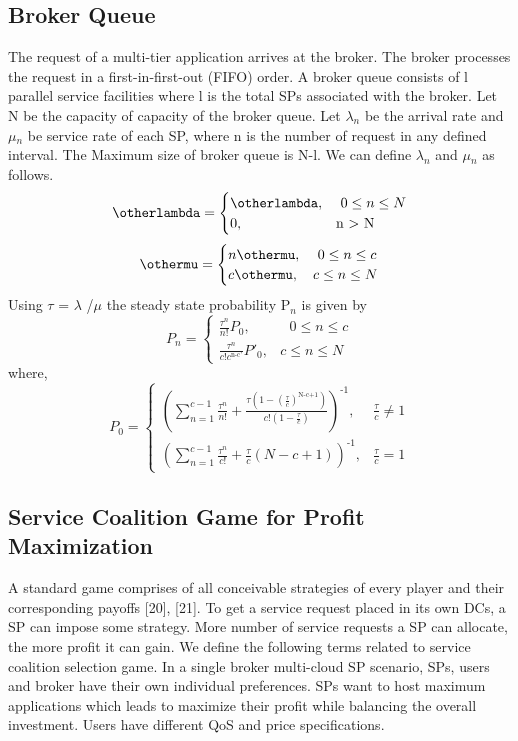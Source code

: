 \documentclass[conference]{IEEEtran}
\newcommand\tab[1][0.8cm]{\hspace*{#1}}
\begin{document}
\subsection{Broker Queue}
\tab The request of a multi-tier application arrives at the broker.
The broker processes the request in a first-in-first-out (FIFO)
order. A broker queue consists of l parallel service facilities
where l is the total SPs associated with the broker. Let N be
the capacity of capacity of the broker queue. Let $\lambda$$_n$ be the arrival rate and $\mu$$_n$ be service rate of each
SP, where n is the number of request in any defined interval.
\newline
The Maximum size of broker queue is N-l. We can define 
$\lambda$$_n$ and $\mu$$_n$ as follows.
\begin{equation}
{\otherlambda} =\begin{cases}
\otherlambda,& \text{ } 0\leq n\leq N\\
0,              & \text{n $>$ N}
\end{cases}
\end{equation}
\begin{equation}
{\othermu} =\begin{cases}
n\othermu,& \text{ } 0\leq n\leq c\\
c\othermu,              & c\leq n\leq N
\end{cases}
\end{equation}
Using $\tau$ = $\lambda$ /$\mu$ the steady state probability P$_n$ is given by
\begin{equation}
P_n =\begin{cases}
\frac{\tau ^n}{n!}P_0,& \text{ } 0\leq n\leq c\\
\frac{\tau ^n}{c!c^{\text{n-c'}}}P'_0,              & c\leq n\leq N
\end{cases}
\end{equation}
where,
\begin{equation}
P_0 =\begin{cases}
( \sum_{n=1}^{c-1} \frac{\tau ^n}{n!}+ \frac{\tau(1-(\frac{\tau}{c})^{\text{N-c+1}})}{c!(1-\frac{\tau}{c})} )^{\text{-1}},& \frac{\tau}{c} \not= 1 \\
( \sum_{n=1}^{c-1}\frac{\tau ^n}{c!}+\frac{\tau}{c}(N-c+1))^{\text{-1}},              & \frac{\tau}{c} = 1
\end{cases}
\end{equation}
\subsection{Service Coalition Game for Profit Maximization}\label{AA}
A standard game comprises of all conceivable strategies of
every player and their corresponding payoffs [20], [21]. To get
a service request placed in its own DCs, a SP can impose some
strategy. More number of service requests a SP can allocate,
the more profit it can gain. We define the following terms
related to service coalition selection game.
\newline
\tab In a single broker multi-cloud SP scenario, SPs, users and
broker have their own individual preferences. SPs want to
host maximum applications which leads to maximize their
profit while balancing the overall investment. Users have
different QoS and price specifications.
\end{document}
